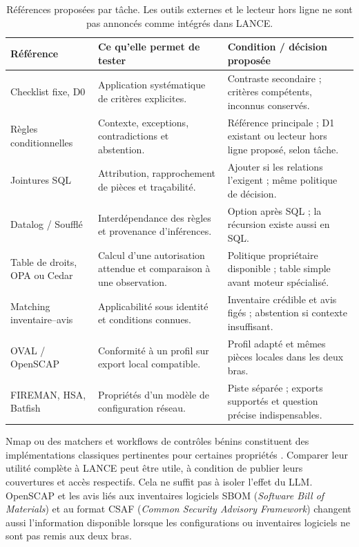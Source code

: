 \documentclass[11pt,a4paper]{article}
\begin{document}
\begin{table}[htbp]\centering\small
\begin{tabularx}{\linewidth}{p{32mm}YY}
\toprule
Référence & Ce qu'elle permet de tester & Condition / décision proposée\\
\midrule
Checklist fixe, D0 & Application systématique de critères explicites. & Contraste secondaire ; critères compétents, inconnus conservés.\\
Règles conditionnelles & Contexte, exceptions, contradictions et abstention. & Référence principale ; D1 existant ou lecteur hors ligne proposé, selon tâche.\\
Jointures SQL & Attribution, rapprochement de pièces et traçabilité. & Ajouter si les relations l'exigent ; même politique de décision.\\
Datalog / Soufflé & Interdépendance des règles et provenance d'inférences. & Option après SQL ; la récursion existe aussi en SQL.\\
Table de droits, OPA ou Cedar & Calcul d'une autorisation attendue et comparaison à une observation. & Politique propriétaire disponible ; table simple avant moteur spécialisé.\\
Matching inventaire--avis & Applicabilité sous identité et conditions connues. & Inventaire crédible et avis figés ; abstention si contexte insuffisant.\\
OVAL / OpenSCAP & Conformité à un profil sur export local compatible. & Profil adapté et mêmes pièces locales dans les deux bras.\\
FIREMAN, HSA, Batfish & Propriétés d'un modèle de configuration réseau. & Piste séparée ; exports supportés et question précise indispensables.\\
\bottomrule
\end{tabularx}
\caption{Références proposées par tâche. Les outils externes et le lecteur
hors ligne ne sont pas annoncés comme intégrés dans LANCE.}\label{tab:choix}
\end{table}

Nmap ou des matchers et workflows de contrôles bénins constituent des
implémentations classiques pertinentes pour certaines propriétés
\cite{outils}. Comparer leur utilité complète à LANCE peut être utile, à
condition de publier leurs couvertures et accès respectifs. Cela ne suffit
pas à isoler l'effet du LLM. OpenSCAP et les avis liés aux inventaires logiciels
SBOM (\emph{Software Bill of Materials}) et au format CSAF
(\emph{Common Security Advisory Framework}) changent aussi
l'information disponible lorsque les configurations ou inventaires logiciels
ne sont pas remis aux deux bras.
\end{document}
